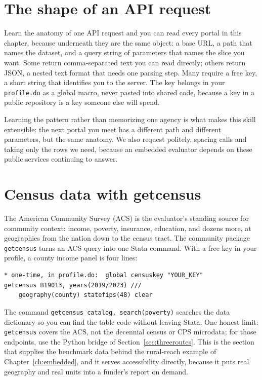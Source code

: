 \documentclass[
    a4paper,
    fontsize=10pt,
    twoside=true,
    numbers=noenddot,
]{kaobook}
\begin{document}
\section{The shape of an API request}
Learn the anatomy of one API request and you can read every portal in this chapter, because underneath they are the same object: a base URL, a path that names the dataset, and a query string of parameters that names the slice you want. Some return comma-separated text you can read directly; others return JSON, a nested text format that needs one parsing step. Many require a free key, a short string that identifies you to the server. The key belongs in your \texttt{profile.do} as a global macro, never pasted into shared code, because a key in a public repository is a key someone else will spend.

Learning the pattern rather than memorizing one agency is what makes this skill extensible: the next portal you meet has a different path and different parameters, but the same anatomy. We also request politely, spacing calls and taking only the rows we need, because an embedded evaluator depends on these public services continuing to answer.

\section{Census data with getcensus}
The American Community Survey (ACS) is the evaluator's standing source for community context: income, poverty, insurance, education, and dozens more, at geographies from the nation down to the census tract. The community package \texttt{getcensus} turns an ACS query into one Stata command. With a free key in your profile, a county income panel is four lines:
{\footnotesize
\begin{verbatim}
* one-time, in profile.do:  global censuskey "YOUR_KEY"
getcensus B19013, years(2019/2023) ///
    geography(county) statefips(48) clear
\end{verbatim}
}
The command \texttt{getcensus catalog, search(poverty)} searches the data dictionary so you can find the table code without leaving Stata. One honest limit: \texttt{getcensus} covers the ACS, not the decennial census or CPS microdata; for those endpoints, use the Python bridge of Section~\ref{sec:threeroutes}. This is the section that supplies the benchmark data behind the rural-reach example of Chapter~\ref{ch:embedded}, and it serves accessibility directly, because it puts real geography and real units into a funder's report on demand.
\end{document}
